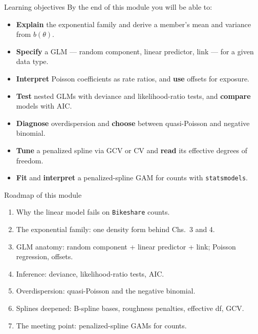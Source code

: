 \documentclass[aspectratio=169,11pt]{beamer}
\begin{document}
\begin{frame}{Learning objectives}
  By the end of this module you will be able to:
  \begin{itemize}
    \item \textbf{Explain} the exponential family and derive a member's mean and variance from $b(\theta)$.
    \item \textbf{Specify} a GLM --- random component, linear predictor, link --- for a given data type.
    \item \textbf{Interpret} Poisson coefficients as rate ratios, and \textbf{use} offsets for exposure.
    \item \textbf{Test} nested GLMs with deviance and likelihood-ratio tests, and \textbf{compare} models with AIC.
    \item \textbf{Diagnose} overdispersion and \textbf{choose} between quasi-Poisson and negative binomial.
    \item \textbf{Tune} a penalized spline via GCV or CV and \textbf{read} its effective degrees of freedom.
    \item \textbf{Fit} and \textbf{interpret} a penalized-spline GAM for counts with \texttt{statsmodels}.
  \end{itemize}
\end{frame}

\begin{frame}{Roadmap of this module}
  \begin{takeaway}
    \begin{enumerate}
      \item Why the linear model fails on \texttt{Bikeshare} counts.
      \item The exponential family: one density form behind Chs.\ 3 and 4.
      \item GLM anatomy: random component + linear predictor + link; Poisson regression, offsets.
      \item Inference: deviance, likelihood-ratio tests, AIC.
      \item Overdispersion: quasi-Poisson and the negative binomial.
      \item Splines deepened: B-spline bases, roughness penalties, effective df, GCV.
      \item The meeting point: penalized-spline GAMs for counts.
    \end{enumerate}
  \end{takeaway}
\end{frame}
\end{document}
